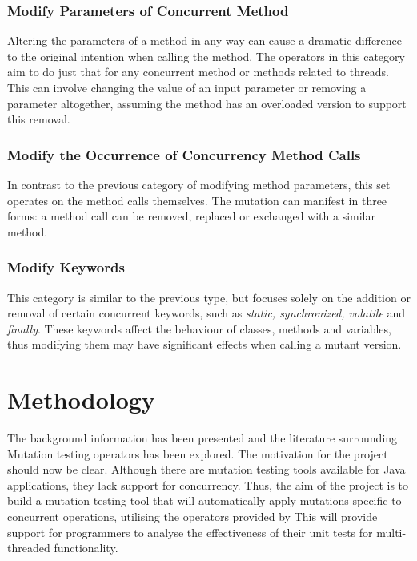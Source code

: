 \documentclass[a4paper,12pt]{article}
\begin{document}
\subsubsection{Modify Parameters of Concurrent Method} \label{section:Modify Parameters}

Altering the parameters of a method in any way can cause a dramatic difference to the original intention when calling the method. The operators in this category aim to do just that for any concurrent method or methods related to threads. This can involve changing the value of an input parameter or removing a parameter altogether, assuming the method has an overloaded version to support this removal.  


\subsubsection{Modify the Occurrence of Concurrency Method Calls} \label{section:Modify Method Calls}

In contrast to the previous category of modifying method parameters, this set operates on the method calls themselves. The mutation can manifest in three forms: a method call can be removed, replaced or exchanged with a similar method.   


\subsubsection{Modify Keywords} \label{section:Modify Keywords}

This category is similar to the previous type, but focuses solely on the addition or removal of certain concurrent keywords, such as \textit{static, synchronized, volatile} and \textit{finally}. These keywords affect the behaviour of classes, methods and variables, thus modifying them may have significant effects when calling a mutant version.


\newpage
\section{Methodology} \label{section:Methodology}

The background information has been presented and the literature surrounding Mutation testing operators has been explored. The motivation for the project should now be clear. Although there are mutation testing tools available for Java applications, they lack support for concurrency. Thus, the aim of the project is to build a mutation testing tool that will automatically apply mutations specific to concurrent operations, utilising the operators provided by \citet{bradbury06} This will provide support for programmers to analyse the effectiveness of their unit tests for multi-threaded functionality.
\end{document}

